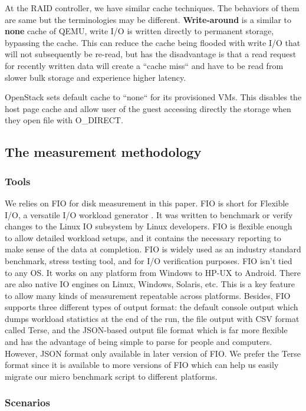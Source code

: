 \documentclass{acmsig}
\begin{document}
At the RAID controller, we have similar cache techniques. The behaviors of them are same but the terminologies may be different. \textbf{Write-around} is a similar to \textbf{none} cache of QEMU, write I/O is written directly to permanent storage, bypassing the cache. This can reduce the cache being flooded with write I/O that will not subsequently be re-read, but has the disadvantage is that a read request for recently written data will create a ``cache miss`` and have to be read from slower bulk storage and experience higher latency.

OpenStack sets default cache to ``none`` for its provisioned VMs. This disables the host page cache and allow user of the guest accessing directly the storage when they open file with O\_DIRECT.

\subsection{The measurement methodology}

\subsubsection{Tools}

We relies on FIO for disk measurement in this paper. FIO is short for Flexible I/O, a versatile I/O workload generator \cite{fio}. It was written to benchmark or verify changes to the Linux IO subsystem by Linux developers. FIO is flexible enough to allow detailed workload setups, and it contains the necessary reporting to make sense of the data at completion. FIO is widely used as an industry standard benchmark, stress testing tool, and for I/O verification purposes. FIO isn't tied to any OS. It works on any platform from Windows to HP-UX to Android. There are also native IO engines on Linux, Windows, Solaris, etc. This is a key feature to allow many kinds of measurement repeatable across platforms. Besides, FIO supports three different types of output format: the default console output which dumps workload statistics at the end of the run, the file output with CSV format called Terse, and the JSON-based output file format which is far more flexible and has the advantage of being simple to parse for people and computers. However, JSON format only available in later version of FIO. We prefer the Terse format since it is available to more versions of FIO which can help us easily migrate our micro benchmark script to different platforms.

\subsubsection{Scenarios}
\end{document}
